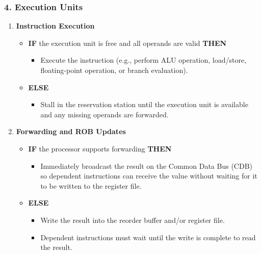 {  \subsubsection*{4. Execution Units}
  \vspace{-5px}
  \begin{enumerate}
      \item \textbf{Instruction Execution}
      \begin{itemize}
          \item \textbf{IF} the execution unit is free and all operands are valid \textbf{THEN}
          \begin{itemize}
              \item Execute the instruction (e.g., perform ALU operation, load/store, floating-point operation, or branch evaluation).
          \end{itemize}
          \item \textbf{ELSE}
          \begin{itemize}
              \item Stall in the reservation station until the execution unit is available and any missing operands are forwarded.
          \end{itemize}
      \end{itemize}
      \item \textbf{Forwarding and ROB Updates}
      \begin{itemize}
          \item \textbf{IF} the processor supports forwarding \textbf{THEN}
          \begin{itemize}
              \item Immediately broadcast the result on the Common Data Bus (CDB) so dependent instructions can receive the value without waiting for it to be written to the register file.
          \end{itemize}
          \item \textbf{ELSE}
          \begin{itemize}
              \item Write the result into the reorder buffer and/or register file.
              \item Dependent instructions must wait until the write is complete to read the result.
          \end{itemize}
      \end{itemize}
  \end{enumerate}
  \vspace{-15px}
}
